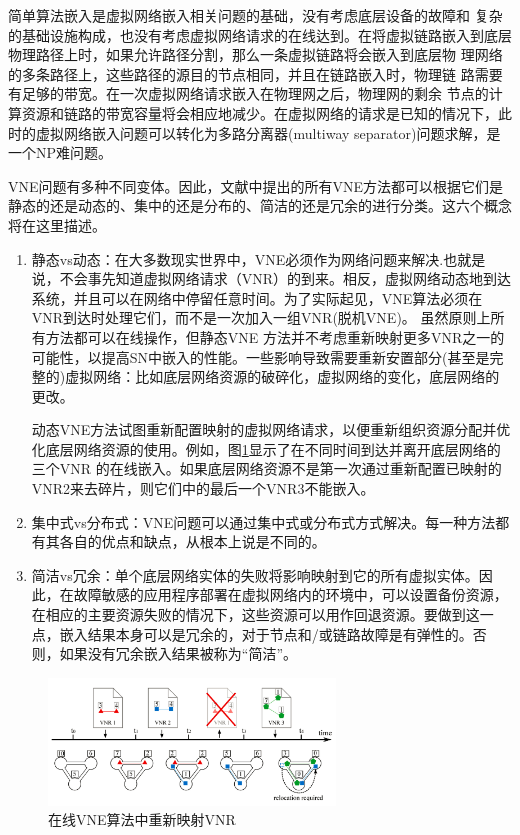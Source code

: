 简单算法嵌入是虚拟网络嵌入相关问题的基础，没有考虑底层设备的故障和 复杂的基础设施构成，也没有考虑虚拟网络请求的在线达到。在将虚拟链路嵌入到底层物理路径上时，如果允许路径分割，那么一条虚拟链路将会嵌入到底层物 理网络的多条路径上，这些路径的源目的节点相同，并且在链路嵌入时，物理链 路需要有足够的带宽\cite{yu2008rethinking}。在一次虚拟网络请求嵌入在物理网之后，物理网的剩余 节点的计算资源和链路的带宽容量将会相应地减少。在虚拟网络的请求是已知的情况下，此时的虚拟网络嵌入问题可以转化为多路分离器(multiway separator)问题求解，是一个NP难问题\cite{andersen2002theoretical}。

VNE问题有多种不同变体。因此，文献中提出的所有VNE方法都可以根据它们是静态的还是动态的、集中的还是分布的、简洁的还是冗余的进行分类。这六个概念将在这里描述。
\begin{enumerate}
  \item 静态vs动态：在大多数现实世界中，VNE必须作为网络问题来解决.也就是说，不会事先知道虚拟网络请求（VNR）的到来。相反，虚拟网络动态地到达系统，并且可以在网络中停留任意时间。为了实际起见，VNE算法必须在VNR到达时处理它们，而不是一次加入一组VNR(脱机VNE)。 虽然原则上所有方法都可以在线操作，但静态VNE 方法并不考虑重新映射更多VNR之一的可能性，以提高SN中嵌入的性能。一些影响导致需要重新安置部分(甚至是完整的)虚拟网络：比如底层网络资源的破碎化，虚拟网络的变化，底层网络的更改。

      动态VNE方法试图重新配置映射的虚拟网络请求，以便重新组织资源分配并优化底层网络资源的使用。例如，图\ref{fig:RelocationMappedVNRsOnlineVNE}显示了在不同时间到达并离开底层网络的三个VNR 的在线嵌入。如果底层网络资源不是第一次通过重新配置已映射的VNR2来去碎片，则它们中的最后一个VNR3不能嵌入。


  \item 集中式vs分布式：VNE问题可以通过集中式或分布式方式解决。每一种方法都有其各自的优点和缺点，从根本上说是不同的。
  \item 简洁vs冗余：单个底层网络实体的失败将影响映射到它的所有虚拟实体。因此，在故障敏感的应用程序部署在虚拟网络内的环境中，可以设置备份资源，在相应的主要资源失败的情况下，这些资源可以用作回退资源。要做到这一点，嵌入结果本身可以是冗余的，对于节点和/或链路故障是有弹性的。否则，如果没有冗余嵌入结果被称为“简洁”。
\end{enumerate}

\begin{figure}[htbp]
\centering
\includegraphics[width=3.0in]{figures/RelocationMappedVNRsOnlineVNE}
  \caption{在线VNE算法中重新映射VNR}
  \label{fig:RelocationMappedVNRsOnlineVNE}
\end{figure}

